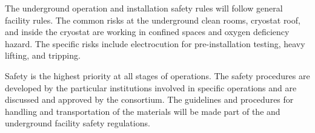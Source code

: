 The underground operation and installation safety rules will follow general facility rules. The common risks at the underground clean rooms, cryostat roof, and inside the cryostat are working in confined spaces and oxygen deficiency hazard. The \dual {} specific risks include electrocution for pre-installation testing, heavy lifting, and tripping.

Safety is the highest priority at all stages of \dual {} operations. The safety procedures are developed by the particular institutions involved in specific operations and are discussed and approved by the consortium. The guidelines and procedures for handling and transportation of the \dual {} materials will be made part of the  and underground facility safety regulations.








